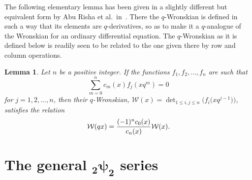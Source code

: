 \documentclass[pdftex]{sigma}
\numberwithin{equation}{section}
\newtheorem{Lemma}[Theorem]{Lemma}
\begin{document}
The following elementary lemma has been given in a slightly different but equivalent form by Abu Risha et al.\ in~\cite[Theorem~3.3]{AbuRisha2007}. There the $q$-Wronskian is defined in such a way that its elements are $q$-derivatives, so as to make it a $q$-analogue of the Wronskian for an ordinary differential equation. The $q$-Wronskian as it is defined below is readily seen to be related to the one given there by row and column operations.

\begin{Lemma} \label{lem:Wronskian}
Let $n$ be a positive integer. If the functions $f_1, f_2, \dots, f_n$ are such that
\[ \sum_{m=0}^n c_m(x) f_j(xq^m) = 0 \]
for $j=1,2,\dots,n$, then their $q$-Wronskian, $\mathcal{W}(x) = \det_{1\leq i,j \leq n} \bigl( f_i\bigl(xq^{j-1}\bigr) \bigr)$, satisfies the relation
\[ \mathcal{W}(qx) = {(-1)^n c_0(x) \over c_n(x)} \mathcal{W}(x). \]
\end{Lemma}

\section[The general \_2psi\_2 series]{The general $\boldsymbol{_2\psi_2}$ series} \label{sect:2psi2_series}
\end{document}
